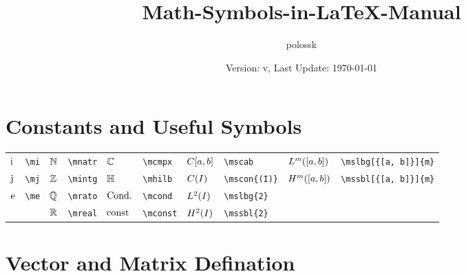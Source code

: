 \documentclass{article}
\title{Math-Symbols-in-\LaTeX{}-Manual}
\author{polossk}
\date{Version: v\artversion, Last Update: \today}
\begin{document}
\maketitle
\tableofcontents
\thispagestyle{fancy}
\renewcommand{\baselinestretch}{1.25}
\sWuhao\fSong
\section{Constants and Useful Symbols}
\begin{tabular}{*{10}{l}}
$\mi$ & \lstinline`\mi` & $\mnatr$ & \lstinline`\mnatr` & $\mcmpx$ & \lstinline`\mcmpx` & $\mscab$ & \lstinline`\mscab` & $\mslbg[{[a, b]}]{m}$ & \lstinline`\mslbg[{[a, b]}]{m}`\\
$\mj$ & \lstinline`\mj` & $\mintg$ & \lstinline`\mintg` & $\mhilb$ & \lstinline`\mhilb` & $\mscon{(I)}$ & \lstinline`\mscon{(I)}` & $\mssbl[{[a, b]}]{m}$ & \lstinline`\mssbl[{[a, b]}]{m}`\\
$\me$ & \lstinline`\me` & $\mrato$ & \lstinline`\mrato` & $\mcond$ & \lstinline`\mcond` & $\mslbg{2}$ & \lstinline`\mslbg{2}` & \\
 &  & $\mreal$ & \lstinline`\mreal` & $\mconst$ & \lstinline`\mconst` & $\mssbl{2}$ & \lstinline`\mssbl{2}` & \\
\end{tabular}

\section{Vector and Matrix Defination}
\end{document}
